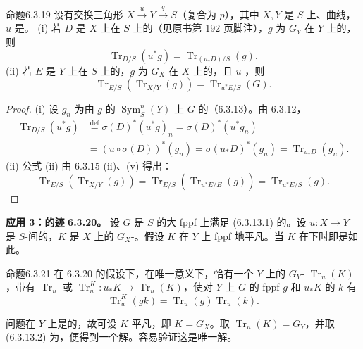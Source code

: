 \begin{SGAresult}{命题}{6.3.19}
设有交换三角形 $X\xrightarrow{u}Y\xrightarrow{q}S$（复合为 $p$），其中 $X,Y$ 是 $S$ 上、曲线，$u$ 是。
(i) 若 $D$ 是 $X$ 上在 $S$ 上的（见原书第 192 页脚注），$g$ 为 $G_Y$ 在 $Y$ 上的，则
\[\operatorname{Tr}_{D/S}(u^*g)=\operatorname{Tr}_{(u_*D)/S}(g).\]
(ii) 若 $E$ 是 $Y$ 上在 $S$ 上的，$g$ 为 $G_X$ 在 $X$ 上的，且 $u$ ，则
\[\operatorname{Tr}_{E/S}(\operatorname{Tr}_{X/Y}(g))=\operatorname{Tr}_{u^*E/S}(G).\]
\end{SGAresult}
\begin{proof}
(i) 设 $g_n$ 为由 $g$ 的 $\operatorname{Sym}_S^n(Y)$ 上 $G$ 的（6.3.13）。由 6.3.12，
\[\begin{aligned}\operatorname{Tr}_{D/S}(u^*g)&\overset{\mathrm{def}}=\sigma(D)^*(u^*g)_n=\sigma(D)^*(u^*g_n)\\&=(u\circ\sigma(D))^*(g_n)=\sigma(u_*D)^*(g_n)=\operatorname{Tr}_{u_*D}(g_n).\end{aligned}\]
(ii) 公式 (ii) 由 6.3.15 (ii)、(v) 得出：
\[\operatorname{Tr}_{E/S}(\operatorname{Tr}_{X/Y}(g))=\operatorname{Tr}_{E/S}(\operatorname{Tr}_{u^*E/E}(g))=\operatorname{Tr}_{u^*E/S}(g).\]
\end{proof}
\textbf{应用 3：的迹}
\textbf{6.3.20。} 设 $G$ 是 $S$ 的大 fppf 上满足 (6.3.13.1) 的。设 $u:X\to Y$ 是 $S$-间的，$K$ 是 $X$ 上的 $G_X$-。假设 $K$ 在 $Y$ 上 fppf 地平凡。当 $K$ 在下时即是如此。
\begin{SGAresult}{命题}{6.3.21}
在 6.3.20 的假设下，在唯一意义下，恰有一个 $Y$ 上的 $G_Y$- $\operatorname{Tr}_u(K)$，带有 $\operatorname{Tr}_u$ 或 $\operatorname{Tr}_u^K:u_*K\to\operatorname{Tr}_u(K)$，使对 $Y$ 上 $G$ 的 fppf  $g$ 和 $u_*K$ 的 $k$ 有
\[\operatorname{Tr}_u^K(gk)=\operatorname{Tr}_u(g)\operatorname{Tr}_u(k).\]
\end{SGAresult}
问题在 $Y$ 上是的，故可设 $K$ 平凡，即 $K=G_X$。取 $\operatorname{Tr}_u(K)=G_Y$，并取 (6.3.13.2) 为，便得到一个解。容易验证这是唯一解。
